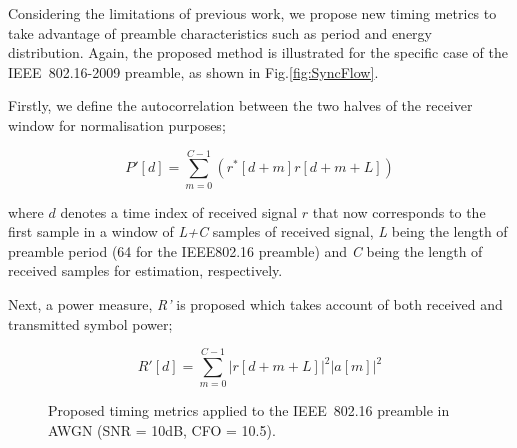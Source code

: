 Considering the limitations of previous work, we propose new timing metrics to take advantage of preamble characteristics such as period and energy distribution.
Again, the proposed method is illustrated for the specific case of the IEEE~802.16-2009 preamble, as shown in Fig.\ref{fig:SyncFlow}.

Firstly, we define the autocorrelation between the two halves of the receiver window for normalisation purposes;

\begin{equation}
\label{ProposedP}
P'[d] =\sum_{m =0}^{C-1}    (r^{*}[d+m] r[d+m+L] )
\end{equation}

where $d$ denotes a time index of received signal $r$ that now corresponds to the first sample in a window of \emph{L+C} samples of received signal, \emph{L} being the length of preamble period (64 for the IEEE802.16 preamble) and \emph{C} being the length of received samples for estimation, respectively.

Next, a power measure, \emph{R'} is proposed which takes account of both received and transmitted symbol power;

\begin{equation}
\label{ProposedR}
R'[d] =\sum_{m =0}^{C-1}   |r[d+m+L]|^2  |a[m]|^2
\end{equation}


\begin{figure}
\centering
	\caption{Proposed timing metrics applied to the IEEE~802.16 preamble in AWGN (SNR = 10{\thinspace}dB, CFO = 10.5).}
	\label{fig:ProposedMetric-10dB}
\end{figure}


